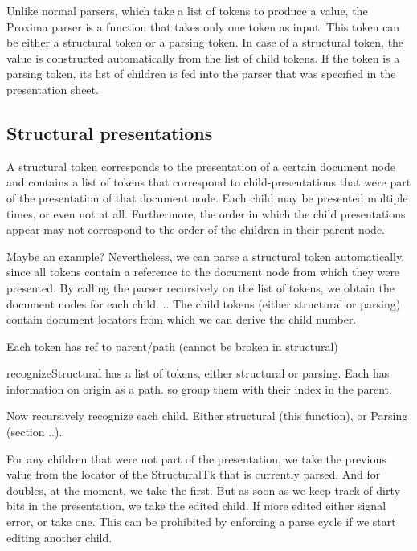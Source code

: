\documentclass[12pt]{article}
\begin{document}
Unlike normal parsers, which take a list of tokens to produce a value, the Proxima parser is a function that takes only one token as input. This token can be either a structural token or a parsing token. In case of a structural token, the value is constructed automatically from the list of child tokens. If the token is a parsing token, its list of children is fed into the parser that was specified in the presentation sheet.

\subsection{Structural presentations}

A structural token corresponds to the presentation of a certain document node and contains a list of tokens that correspond to child-presentations that were part of the presentation of that document node. Each child may be presented multiple times, or even not at all. Furthermore, the order in which the child presentations appear may not correspond to the order of the children in their parent node.

Maybe an example? 
Nevertheless, we can parse a structural token automatically, since all tokens contain a  reference to the document node from which they were presented.   By calling the parser recursively on the list of tokens, we obtain the document nodes for each child. .. The child tokens (either structural or parsing) contain document locators from which we can derive the child number.


Each token has ref to parent/path (cannot be broken in structural)

recognizeStructural
has a list of tokens, either structural or parsing. Each has information on origin as a path. so group them with their index in the parent.

Now recursively recognize each child. Either structural (this function), or Parsing (section ..). 

For any children that were not part of the presentation, we take the previous value from the locator of the StructuralTk that is currently parsed. And for doubles, at the moment, we take the first. But as soon as we keep track of dirty bits in the presentation, we take the edited child. If more edited either signal error, or take one. This can be prohibited by enforcing a parse cycle if we start editing another child.

\end{document}
